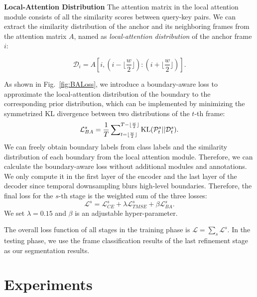 \documentclass[letterpaper]{article} \usepackage[submission]{aaai23}  \usepackage{times}  \usepackage{helvet}  \usepackage{courier}  \usepackage[hyphens]{url}  \usepackage{graphicx} \urlstyle{rm} \def\UrlFont{\rm}  \usepackage{natbib}  \usepackage{caption} \frenchspacing  \setlength{\pdfpagewidth}{8.5in} \setlength{\pdfpageheight}{11in} \usepackage{algorithm}
\begin{document}
\textbf{Local-Attention Distribution}\quad 
The attention matrix in the local attention module consists of all the similarity scores between query-key pairs. We can extract the similarity distribution of the anchor and its neighboring frames from the attention matrix $A$, named as {\em local-attention distribution} of the anchor frame $i$:
\begin{footnotesize}
\begin{equation}
\label{eq:lad}
\mathcal{D}_i = A\left [i,(i-\lfloor \frac{w}{2} \rfloor):(i+\lfloor \frac{w}{2} \rfloor)\right ].
\end{equation}
\end{footnotesize}
As shown in Fig.~\ref{fig:BALoss}, we introduce a boundary-aware loss to approximate the local-attention distribution of the boundary to the corresponding prior distribution, which can be implemented by minimizing the symmetrized KL divergence between two distributions of the $t$-th frame:
\begin{equation}
\label{eq:baloss} 
\mathcal{L}_{BA}^s = \frac{1}{T} \sum\nolimits_{t=\lfloor \frac{w}{2} \rfloor}^{T-\lfloor \frac{w}{2} \rfloor} \textup{KL}(\mathcal{P}_t^s||\mathcal{D}_t^s).
\end{equation}
We can freely obtain boundary labels from class labels and the similarity distribution of each boundary from the local attention module. Therefore, we can calculate the boundary-aware loss without additional modules and annotations. We only compute it in the first layer of the encoder and the last layer of the decoder since temporal downsampling blurs high-level boundaries. Therefore, the final loss for the $s$-th stage is the weighted sum of the three losses:
\begin{equation}
\label{eq:stageloss} 
\mathcal{L}^s = \mathcal{L}_{CE}^s + \lambda \mathcal{L}_{TMSE}^s + \beta \mathcal{L}_{BA}^s.
\end{equation}
We set \(\lambda = 0.15\) and $\beta$ is an adjustable hyper-parameter.

The overall loss function of all stages in the training phase is $\mathcal{L} = \sum_s\mathcal{L}^s$.
In the testing phase, we use the frame classification results of the last refinement stage as our segmentation results.







\section{Experiments}
\label{sec:exp}
\end{document}
